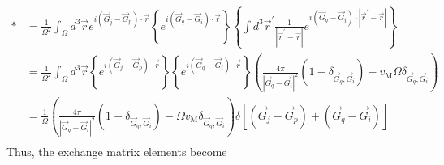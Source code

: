 \begin{align}
* 
&= \frac{1}{\Omega^2} \int_{\Omega} d^3 \vec{r}  e^{i\left(\vec{G}_j-\vec{G}_p\right) \cdot \vec{r}}\left\{e^{i\left(\vec{G}_q-\vec{G}_i\right) \cdot \vec{r}}\right\}\left\{\int d^3 \vec{r}^{\prime} \frac{1}{\left|\vec{r}^{\prime}-\vec{r}\right|} e^{i\left(\vec{G}_q-\vec{G}_i\right) \cdot |\vec{r}^{\prime}-\vec{r}|}\right\} \\
&= \frac{1}{\Omega^2} \int_{\Omega} d^3 \vec{r}\left\{e^{i\left(\vec{G}_j-\vec{G}_p\right) \cdot \vec{r}}\right\}\left\{e^{i\left(\vec{G}_q-\vec{G}_i\right) \cdot \vec{r}}\right\} \left(\frac{4 \pi}{\left|\vec{G}_q-\vec{G}_i\right|^2}\left(1-\delta_{\vec{G}_q,\vec{G}_i}\right) - v_{\mathrm{M}}\Omega\delta_{\vec{G}_q,\vec{G}_i}\right) \\
&= \frac{1}{\Omega} \left(\frac{4 \pi}{\left|\vec{G}_q-\vec{G}_i\right|^2} \left(1-\delta_{\vec{G}_q,\vec{G}_i}\right) - \Omega v_{\mathrm{M}}\delta_{\vec{G}_q,\vec{G}_i}\right) \delta\left[\left(\vec{G}_j-\vec{G}_p\right)+\left(\vec{G}_q-\vec{G}_i\right)\right] \\
\end{align}
 Thus, the exchange matrix elements become

